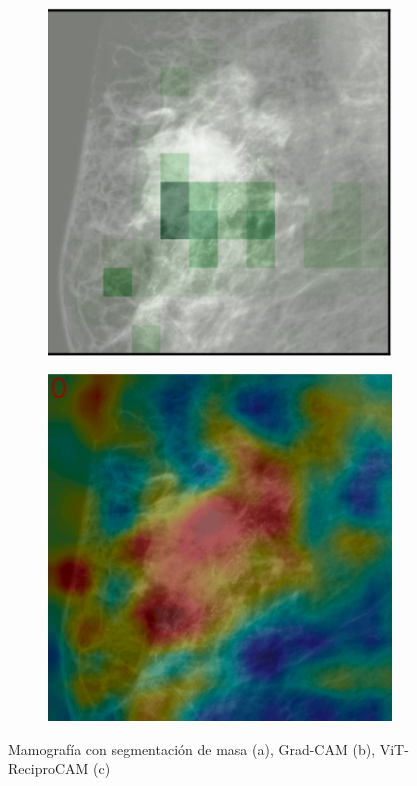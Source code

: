 \documentclass[a4paper,10pt]{book}
\begin{document}
\begin{figure}[h!]
\begin{subfigure}[c]{0.30\textwidth}
        \includegraphics[width=\textwidth]{reports//assets/gcam.png}
        \caption{}
        \label{fig:mlo_grad_2}
    \end{subfigure}
      \begin{subfigure}[c]{0.30\textwidth}
        \centering
        \includegraphics[width=\textwidth]{reports//assets/recipro.png}
        \caption{}
        \label{fig:mlo_recipro_2}
    \end{subfigure}
    \caption[GradCAM vs. ViT-Recipro con Segmentación TOMPEI]{Mamografía con segmentación de masa (a), Grad-CAM (b), ViT-ReciproCAM (c)}
    \label{fig:grad_vs_vit_two}
\end{figure}
\end{document}
